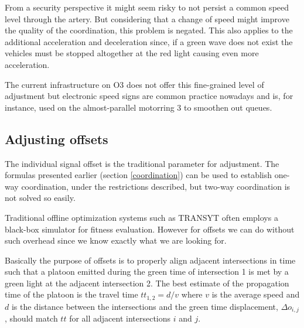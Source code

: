 From a security perspective it might seem risky to not persist a common speed level through the artery. But considering that a change of speed might improve the quality of the coordination, this problem is negated. This also applies to the additional acceleration and deceleration since, if a green wave does not exist the vehicles must be stopped altogether at the red light causing even more acceleration.

The current infrastructure on O3 does not offer this fine-grained level of adjustment but electronic speed signs are common practice nowadays and is, for instance, used on the almost-parallel motorring 3 to smoothen out queues.

\subsection{Adjusting offsets}
The individual signal offset is the traditional parameter for adjustment. The formulas presented earlier (section \ref{coordination}) can be used to establish one-way coordination, under the restrictions described, but two-way coordination is not solved so easily.

Traditional offline optimization systems such as TRANSYT often employs a black-box simulator for fitness evaluation. However for offsets we can do without such overhead since we know exactly what we are looking for.

Basically the purpose of offsets is to properly align adjacent intersections in time such that a platoon emitted during the green time of intersection 1 is met by a green light at the adjacent intersection 2. The best estimate of the propagation time of the platoon is the travel time $tt_{1,2} = d / v$ where $v$ is the average speed and $d$ is the distance between the intersections and the green time displacement, $\Delta o_{i,j}$, should match $tt$ for all adjacent intersections $i$ and $j$.

